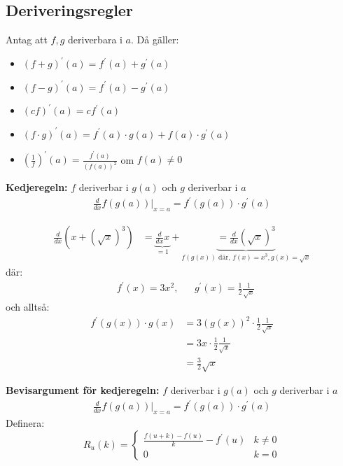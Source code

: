\subsection{Deriveringsregler} %
\label{sub:deriveringsregler}
Antag att $f,g$ deriverbara i $a$. Då gäller:
\begin{itemize}
    \item $(f + g)^\prime(a) = f^\prime(a) + g^\prime(a)$
    \item $(f - g)^\prime(a) = f^\prime(a) - g^\prime(a)$
    \item $(cf)^\prime(a) = cf^\prime(a)$
    \item $(f \cdot g)^\prime(a) = f^\prime(a)\cdot g(a) + f(a) \cdot g^\prime(a)$
    \item $(\frac{1}{f})^\prime(a) = \frac{f^\prime(a)}{(f(a))^2}$ om $f(a) \neq 0$
\end{itemize}
\textbf{Kedjeregeln: } $f$ deriverbar i $g(a)$ och $g$ deriverbar i $a$
\begin{align*}
    \frac{d}{dx}f(g(a))|_{x=a} = f^\prime(g(a)) \cdot g^\prime(a)
\end{align*}
\begin{Ex}
    \begin{align*}
        \frac{d}{dx}(x + (\sqrt{x})^3) &= \underbrace{\frac{d}{dx}x}_{=1} + \underbrace{= \frac{d}{dx}(\sqrt{x})^3}_{f(g(x)) \mbox{ där, } f(x)=x^3, g(x)=\sqrt{x}} 
    \end{align*}
    där:
    \begin{align*}
        &f^\prime(x) = 3x^2, &&g^\prime(x) = \frac{1}{2}\frac{1}{\sqrt{x}}
    \end{align*}
    och alltså:
    \begin{align*}
        f^\prime(g(x)) \cdot g(x) &= 3(g(x))^2 \cdot \frac{1}{2}\frac{1}{\sqrt{x}}  \\
        &=3x \cdot \frac{1}{2} \frac{1}{\sqrt{x}} \\
        &=\frac{3}{2}\sqrt{x}
    \end{align*}
\end{Ex}
\textbf{Bevisargument för kedjeregeln:} $f$ deriverbar i $g(a)$ och $g$ deriverbar i $a$
\begin{align*}
    \frac{d}{dx}f(g(a))|_{x=a} = f^\prime(g(a)) \cdot g^\prime(a)
\end{align*}
Definera:
\[
R_u(k) = 
\begin{cases}
    \frac{f(u+k)-f(u)}{k} - f^\prime(u) & k \neq 0\\
    0 & k=0
\end{cases}
\]

